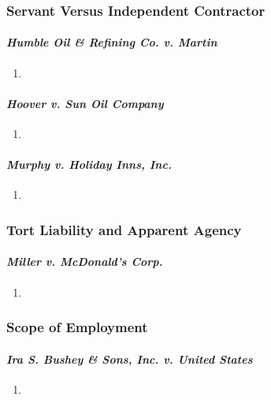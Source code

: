 \subsubsection{Servant Versus Independent Contractor}

\paragraph{\emph{Humble Oil \& Refining Co. v. Martin}}

\begin{enumerate}
    \item %
\end{enumerate}

\paragraph{\emph{Hoover v. Sun Oil Company}}

\begin{enumerate}
    \item %
\end{enumerate}

\paragraph{\emph{Murphy v. Holiday Inns, Inc.}}

\begin{enumerate}
    \item %
\end{enumerate}

\subsubsection{Tort Liability and Apparent Agency}

\paragraph{\emph{Miller v. McDonald's Corp.}}

\begin{enumerate}
    \item %
\end{enumerate}

\subsubsection{Scope of Employment}

\paragraph{\emph{Ira S. Bushey \& Sons, Inc. v. United States}}

\begin{enumerate}
    \item %
\end{enumerate}

